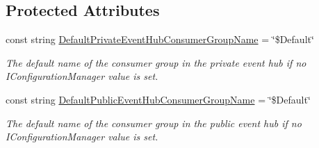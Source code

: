 \subsection*{Protected Attributes}
\begin{DoxyCompactItemize}
\item 
const string \hyperlink{classCqrs_1_1Azure_1_1ServiceBus_1_1AzureEventHub_a523df6f08c43b3ca013c08555098f4ad_a523df6f08c43b3ca013c08555098f4ad}{Default\+Private\+Event\+Hub\+Consumer\+Group\+Name} = \char`\"{}\$Default\char`\"{}
\begin{DoxyCompactList}\small\item\em The default name of the consumer group in the private event hub if no I\+Configuration\+Manager value is set. \end{DoxyCompactList}\item 
const string \hyperlink{classCqrs_1_1Azure_1_1ServiceBus_1_1AzureEventHub_a71191dfe0cccbbc59c37cadf051a5cdd_a71191dfe0cccbbc59c37cadf051a5cdd}{Default\+Public\+Event\+Hub\+Consumer\+Group\+Name} = \char`\"{}\$Default\char`\"{}
\begin{DoxyCompactList}\small\item\em The default name of the consumer group in the public event hub if no I\+Configuration\+Manager value is set. \end{DoxyCompactList}\end{DoxyCompactItemize}

